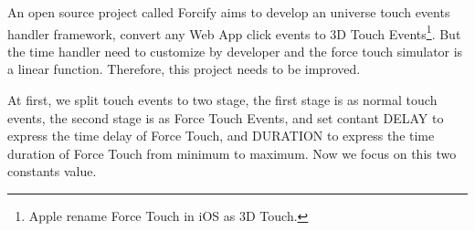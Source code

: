 %
An open source project called Forcify\cite{Huxpro:2016ua} aims to develop an universe touch events handler framework, convert any Web App click events to 3D Touch Events\footnote{Apple rename Force Touch in iOS as 3D Touch.}. But the time handler need to customize by developer and the force touch simulator is a linear function. Therefore, this project needs to be improved.

%
At first, we split touch events to two stage, the first stage is as normal touch events, the second stage is as Force Touch Events, and set contant DELAY to express the time delay of Force Touch, and DURATION to express the time duration of Force Touch from minimum to maximum.
Now we focus on this two constants value.

